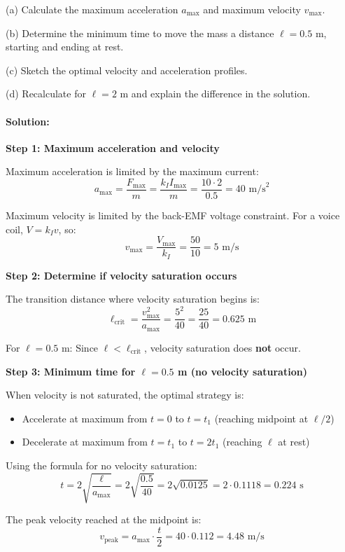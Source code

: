 \documentclass[11pt,a4paper]{article}
\begin{document}
(a) Calculate the maximum acceleration $a_{\max}$ and maximum velocity $v_{\max}$.

(b) Determine the minimum time to move the mass a distance $\ell = 0.5$ m, starting and ending at rest.

(c) Sketch the optimal velocity and acceleration profiles.

(d) Recalculate for $\ell = 2$ m and explain the difference in the solution.

\paragraph{Solution:}

\textbf{Step 1: Maximum acceleration and velocity}

Maximum acceleration is limited by the maximum current:
\[
a_{\max} = \frac{F_{\max}}{m} = \frac{k_I I_{\max}}{m} = \frac{10 \cdot 2}{0.5} = 40 \text{ m/s}^2
\]

Maximum velocity is limited by the back-EMF voltage constraint. For a voice coil, $V = k_I v$, so:
\[
v_{\max} = \frac{V_{\max}}{k_I} = \frac{50}{10} = 5 \text{ m/s}
\]

\textbf{Step 2: Determine if velocity saturation occurs}

The transition distance where velocity saturation begins is:
\[
\ell_{\text{crit}} = \frac{v_{\max}^2}{a_{\max}} = \frac{5^2}{40} = \frac{25}{40} = 0.625 \text{ m}
\]

For $\ell = 0.5$ m: Since $\ell < \ell_{\text{crit}}$, velocity saturation does \textbf{not} occur.

\textbf{Step 3: Minimum time for $\ell = 0.5$ m (no velocity saturation)}

When velocity is not saturated, the optimal strategy is:
\begin{itemize}
\item Accelerate at maximum from $t = 0$ to $t = t_1$ (reaching midpoint at $\ell/2$)
\item Decelerate at maximum from $t = t_1$ to $t = 2t_1$ (reaching $\ell$ at rest)
\end{itemize}

Using the formula for no velocity saturation:
\[
t = 2\sqrt{\frac{\ell}{a_{\max}}} = 2\sqrt{\frac{0.5}{40}} = 2\sqrt{0.0125} = 2 \cdot 0.1118 = 0.224 \text{ s}
\]

The peak velocity reached at the midpoint is:
\[
v_{\text{peak}} = a_{\max} \cdot \frac{t}{2} = 40 \cdot 0.112 = 4.48 \text{ m/s}
\]
\end{document}
